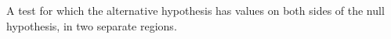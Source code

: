 A test for which the alternative hypothesis has values on both sides 
of the null hypothesis, in two separate regions.